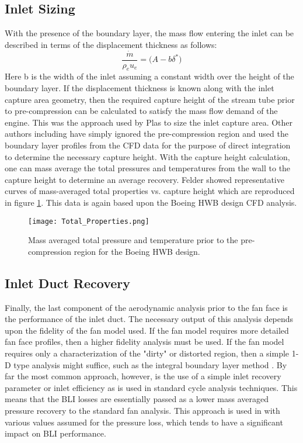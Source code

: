 \subsection{Inlet Sizing}
With the presence of the boundary layer, the mass flow entering the inlet can be described in terms of the displacement thickness as follows:
	\begin{equation}\frac{\dot{m}}
			              {\rho_eu_e} = \Big(A - b\delta^*\Big)
           \end{equation}%
Here b is the width of the inlet assuming a constant width over the height of the boundary layer.  If the displacement thickness is known along with the inlet capture area geometry, then the required capture height of the stream tube prior to pre-compression can be calculated to satisfy the mass flow demand of the engine.  This was the approach used by Plas \cite{PlasThesis} to size the inlet capture area.  Other authors including \cite{Felder2012} have simply ignored the pre-compression region and used the boundary layer profiles from the CFD data for the purpose of direct integration to determine the necessary capture height.
\indent With the capture height calculation, one can mass average the total pressures and temperatures from the wall to the capture height to determine an average recovery.  Felder showed representative curves of mass-averaged total properties vs. capture height which are reproduced in figure \ref{Total_Properties}.  This data is again based upon the Boeing HWB design CFD analysis.
	\begin{figure}[htpb]
	\centering
	\texttt{[image: Total\_Properties.png]}
	 \vspace{-25pt}
	\caption{Mass averaged total pressure and temperature prior to the pre-compression region for the Boeing HWB design.}
	\label{Total_Properties}
	\end{figure}
\subsection{Inlet Duct Recovery}
Finally, the last component of the aerodynamic analysis prior to the fan face is the performance of the inlet duct.  The necessary output of this analysis depends upon the fidelity of the fan model used.  If the fan model requires more detailed fan face profiles, then a higher fidelity analysis must be used.  If the fan model requires only a characterization of the "dirty" or distorted region, then a simple 1-D type analysis might suffice, such as the integral boundary layer method \cite{PlasThesis}.  By far the most common approach, however, is the use of a simple inlet recovery parameter or inlet efficiency as is used in standard cycle analysis techniques.  This means that the BLI losses are essentially passed as a lower mass averaged pressure recovery to the standard fan analysis.  This approach is used in \cite{Felder2011} \cite{Sato2011} \cite{Hardin2012} \cite{Nickol2009}  with various values assumed for the pressure loss, which tends to have a significant impact on BLI performance.

